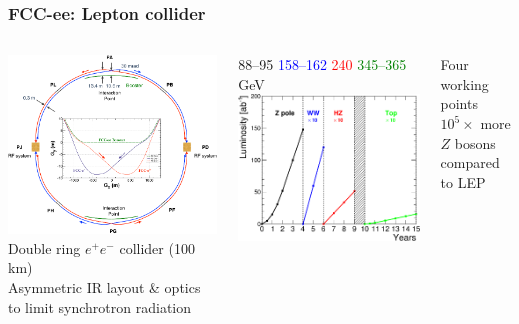 \documentclass[aspectratio=169]{beamer}
\begin{document}
\begin{frame}
  \frametitle{FCC-ee: Lepton collider}
  \begin{columns}[c]
     \includegraphics[width=0.8\linewidth]{figures/FCC_ee_ring.png}\\
     Double ring $e^+e^-$ collider (100 km)\\
     Asymmetric IR layout \& optics to limit synchrotron radiation\\
     
     \begin{center}
       {\footnotesize\hspace{3.3em}88--95
                  \hspace{0.2em}\textcolor{blue}{158--162}
                  \hspace{0.2em}\textcolor{red}{240
                  }\hspace{1.9em}\textcolor{green}{345--365} GeV}
      \includegraphics[width=.85\linewidth]{figures/FCC_ee_operation_plan.png}
     \end{center}
     Four working points\\
     $10^5 \times$ more $Z$ bosons compared to LEP\\
  \end{columns}
\end{frame}
\end{document}
